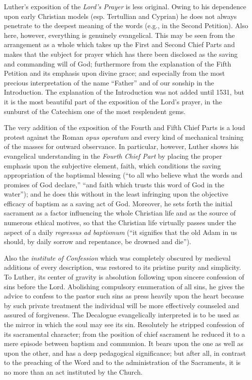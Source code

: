 Luther’s exposition of the \emph{Lord’s Prayer} is less original. Owing to his dependence upon early Christian models (esp. Tertullian and Cyprian) he does not always penetrate to the deepest meaning of the words (e.g., in the Second Petition). Also here, however, everything is genuinely evangelical. This may be seen from the arrangement as a whole which takes up the First and Second Chief Parts and makes that the subject for prayer which has there been disclosed as the saving and commanding will of God; furthermore from the explanation of the Fifth Petition and its emphasis upon divine grace; and especially from the most precious interpretation of the name “Father” and of our sonship in the Introduction. The explanation of the Introduction was not added until 1531, but it is the most beautiful part of the exposition of the Lord’s prayer, in the sunburst of the Catechism one of the most resplendent gems.

The very addition of the exposition of the Fourth and Fifth Chief Parts is a loud protest against the Roman \emph{opus operatum} and every kind of mechanical training of the masses for outward observance. In particular, however, Luther shows his evangelical understanding in the \emph{Fourth Chief Part} by placing the proper emphasis upon the subjective element, faith, which conditions the saving appropriation of the baptismal blessing (“to all who believe what the words and promises of God declare,” “and faith which trusts this word of God in the water”); and he does this without in
the least infringing upon the objective efficacy of baptism as a saving act of God. Moreover, he sets forth the initial sacrament as a factor influencing the whole Christian life and as the source of numerous ethical motives, so that the Christian life virtually passes under the aspect of a daily \emph{regressus ad baptismum} (“it signifies that the old Adam in us should, by daily sorrow and repentance, be drowned and die”).

Also the \emph{institute of \emph{Confession}} which was completely obscured by medieval additions of every description, was restored to its pristine purity and simplicity. To Luther, its center of gravity is absolution following upon sincere confession of sins before the Lord. Abolishing compulsory enumeration of all sins, he gives the advice to confess to the pastor such sins as press heavily upon the heart because by such private treatment the individual will be more effectively counseled and assured of forgiveness. The Decalogue evangelically interpreted is to be used as the mirror in which the soul may see its sin. Resolutely he stripped confession of its sacramental character; from the position of chief sacrament he reduced it to a mere episode between baptism and communion. It bears upon the one as well as upon the other, and has a deep pedagogical significance; but after all, in contrast to the preaching of the Word and to the administration of the Sacraments, it is no more than an act instituted by the Church.

